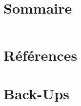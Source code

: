 \documentclass[hidelinks, french, xcolor={table, rgb, dvipsnames, x11names}, aspectratio=169, professionalfonts]{beamer}
\begin{document}


\section*{Sommaire} %
\begin{frame}{\secname}
  \begin{columns}
    \begin{column}{.2\linewidth}
      \hfill
    \end{column}
    \begin{column}{.7\linewidth}
      \tableofcontents[hideallsubsections]
    \end{column}
    \begin{column}{.1\linewidth}
      \hfill
    \end{column}
  \end{columns}
\end{frame}











\section*{Références}
\begin{frame}[allowframebreaks]
  \frametitle{\secname}

  \renewcommand*{\bibfont}{\rikiki}
  \printbibliography[notkeyword=ownpub, notkeyword=own, heading=none]

\end{frame}

\section*{Back-Ups}


\end{document}
